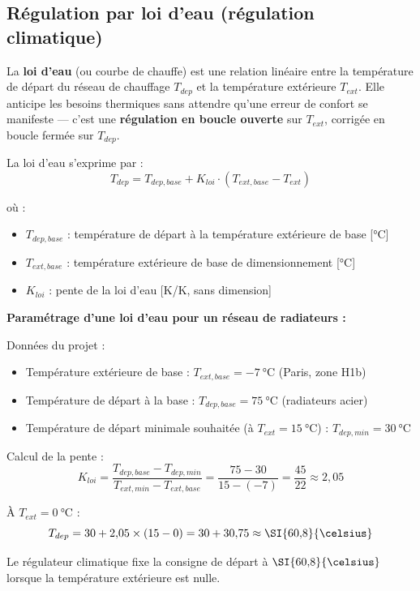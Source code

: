 \subsection{Régulation par loi d'eau (régulation climatique)}

\begin{definition}
  La \textbf{loi d'eau} (ou courbe de chauffe) est une relation linéaire entre la température de départ du réseau de chauffage $T_{dep}$ et la température extérieure $T_{ext}$. Elle anticipe les besoins thermiques sans attendre qu'une erreur de confort se manifeste — c'est une \textbf{régulation en boucle ouverte} sur $T_{ext}$, corrigée en boucle fermée sur $T_{dep}$.
\end{definition}

La loi d'eau s'exprime par :
\begin{equation}
  T_{dep} = T_{dep,base} + K_{loi} \cdot (T_{ext,base} - T_{ext})
\end{equation}

où :
\begin{itemize}
  \item $T_{dep,base}$ : température de départ à la température extérieure de base [\si{\celsius}]
  \item $T_{ext,base}$ : température extérieure de base de dimensionnement [\si{\celsius}]
  \item $K_{loi}$ : pente de la loi d'eau [K/K, sans dimension]
\end{itemize}

\begin{exemple}
  \textbf{Paramétrage d'une loi d'eau pour un réseau de radiateurs :}

  Données du projet :
  \begin{itemize}
    \item Température extérieure de base : $T_{ext,base} = \SI{-7}{\celsius}$ (Paris, zone H1b)
    \item Température de départ à la base : $T_{dep,base} = \SI{75}{\celsius}$ (radiateurs acier)
    \item Température de départ minimale souhaitée (à $T_{ext} = \SI{15}{\celsius}$) : $T_{dep,min} = \SI{30}{\celsius}$
  \end{itemize}

  Calcul de la pente :
  \begin{equation}
    K_{loi} = \frac{T_{dep,base} - T_{dep,min}}{T_{ext,min} - T_{ext,base}} = \frac{75 - 30}{15 - (-7)} = \frac{45}{22} \approx 2{,}05
  \end{equation}

  À $T_{ext} = \SI{0}{\celsius}$ :
  \begin{equation}
    T_{dep} = 30 + 2{,}05 \times (15 - 0) = 30 + 30{,}75 \approx \SI{60{,}8}{\celsius}
  \end{equation}

  Le régulateur climatique fixe la consigne de départ à $\SI{60{,}8}{\celsius}$ lorsque la température extérieure est nulle.
\end{exemple}

